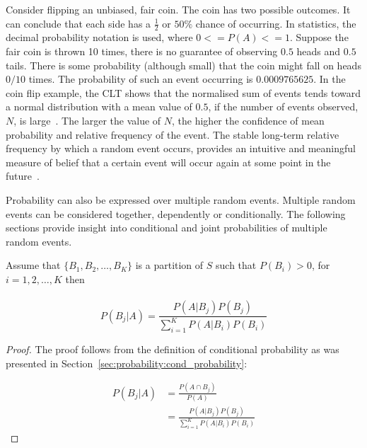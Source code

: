 Consider flipping an unbiased, fair coin. The coin has two possible outcomes. It can conclude that each side has a $\frac{1}{2}$ or $50\%$ chance of occurring. In statistics, the decimal probability notation is used, where $0 <= P(A) <= 1$. Suppose the fair coin is thrown 10 times, there is no guarantee of observing $0.5$ heads and $0.5$ tails. There is some probability (although small) that the coin might fall on heads $0/10$ times. The probability of such an event occurring is $0.0009765625$. In the coin flip example, the \acf{CLT} shows that the normalised sum of events tends toward a normal distribution with a mean value of $0.5$, if the number of events observed, $N$, is large~\cite{ref:wackerly:2014}. The larger the value of $N$, the higher the confidence of mean probability and relative frequency of the event. The stable long-term relative frequency by which a random event occurs, provides an intuitive and meaningful measure of belief that a certain event will occur again at some point in the future~\cite{ref:wackerly:2014}.

Probability can also be expressed over multiple random events. Multiple random events can be considered together, dependently or conditionally. The following sections provide insight into conditional and joint probabilities of multiple random events.

\begin{theorem}
	\label{th:probability:bayes_theorem:theorem}
	Assume that $\{B_{1}, B_{2}, \dots, B_{K}\}$ is a partition of $S$ such that $P(B_{i}) > 0$, for $i = 1,2, \dots, K$ then\\
	\\
	\begin{equation}
		P(B_{j} \vert A) = \frac{P(A \vert B_{j})P(B_{j})}{\sum_{i=1}^{K} P(A \vert B_{i})P(B_{i})}
	\end{equation}
\end{theorem}

\begin{proof}
	The proof follows from the definition of conditional probability as was presented in Section~\ref{sec:probability:cond_probability}:

	\begin{equation}
		\begin{split}
			P(B_{j} \vert A)
			&= \frac{P(A \cap B_{j})}{P(A)}\\
			&= \frac{P(A \vert B_{j})P(B_{j})}{\sum_{i=1}^{K} P(A \vert B_{i})P(B_{i})}
		\end{split}
	\end{equation}
\end{proof}

